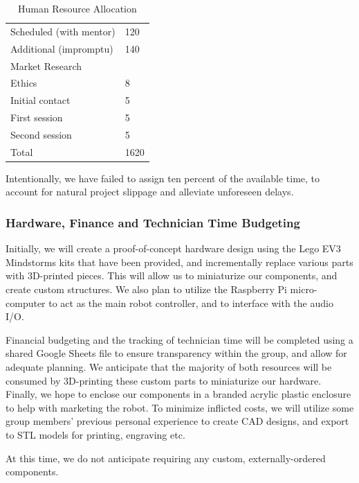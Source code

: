 \documentclass{article}
\begin{document}
\begin{table}[]
\begin{center}
\begin{small}
\begin{tabular}{|l|l|}
\quad Scheduled (with mentor)        & 120   \\
\quad Additional (impromptu)         & 140   \\ \hline
Market Research                &       \\
\quad Ethics                         & 8     \\
\quad Initial contact                & 5     \\
\quad First session                  & 5     \\
\quad Second session                 & 5     \\ \hline
Total                          & 1620  \\ \hline
\end{tabular}
\end{small}
\caption{Human Resource Allocation}
\label{table:hours}
\end{center}
\end{table}

Intentionally, we have failed to assign ten percent of the available time, to account for natural project slippage and alleviate unforeseen delays.

\subsubsection{Hardware, Finance and Technician Time Budgeting}

Initially, we will create a proof-of-concept hardware design using the Lego EV3 Mindstorms kits that have been provided, and incrementally replace various parts with 3D-printed pieces. This will allow us to miniaturize our components, and create custom structures. We also plan to utilize the Raspberry Pi micro-computer to act as the main robot controller, and to interface with the audio I/O.

Financial budgeting and the tracking of technician time will be completed using a shared Google Sheets file to ensure transparency within the group, and allow for adequate planning. We anticipate that the majority of both resources will be consumed by 3D-printing these custom parts to miniaturize our hardware. Finally, we hope to enclose our components in a branded acrylic plastic enclosure to help with marketing the robot. To minimize inflicted costs, we will utilize some group members' previous personal experience to create CAD designs, and export to STL models for printing, engraving etc.

At this time, we do not anticipate requiring any custom, externally-ordered components.
\end{document}
